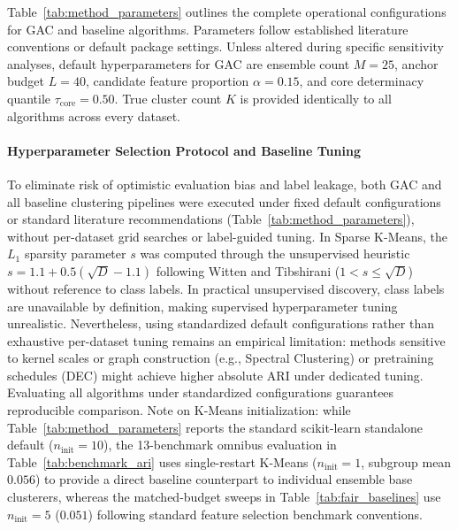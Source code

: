 \documentclass[pdflatex,sn-mathphys-num]{sn-jnl}
\theoremstyle{thmstyleone}
\theoremstyle{thmstyletwo}
\theoremstyle{thmstylethree}
\begin{document}
Table~\ref{tab:method_parameters} outlines the complete operational configurations for GAC and baseline algorithms. Parameters follow established literature conventions or default package settings. Unless altered during specific sensitivity analyses, default hyperparameters for GAC are ensemble count $M = 25$, anchor budget $L = 40$, candidate feature proportion $\alpha = 0.15$, and core determinacy quantile $\tau_{\text{core}} = 0.50$. True cluster count $K$ is provided identically to all algorithms across every dataset.

\paragraph{Hyperparameter Selection Protocol and Baseline Tuning}
To eliminate risk of optimistic evaluation bias and label leakage, both GAC and all baseline clustering pipelines were executed under fixed default configurations or standard literature recommendations (Table~\ref{tab:method_parameters}), without per-dataset grid searches or label-guided tuning. In Sparse K-Means, the $L_1$ sparsity parameter $s$ was computed through the unsupervised heuristic $s = 1.1 + 0.5(\sqrt{D} - 1.1)$ following Witten and Tibshirani ($1 < s \le \sqrt{D}$) without reference to class labels. In practical unsupervised discovery, class labels are unavailable by definition, making supervised hyperparameter tuning unrealistic. Nevertheless, using standardized default configurations rather than exhaustive per-dataset tuning remains an empirical limitation: methods sensitive to kernel scales or graph construction (e.g., Spectral Clustering) or pretraining schedules (DEC) might achieve higher absolute ARI under dedicated tuning. Evaluating all algorithms under standardized configurations guarantees reproducible comparison. Note on K-Means initialization: while Table~\ref{tab:method_parameters} reports the standard scikit-learn standalone default ($n_{\text{init}}=10$), the 13-benchmark omnibus evaluation in Table~\ref{tab:benchmark_ari} uses single-restart K-Means ($n_{\text{init}}=1$, subgroup mean $0.056$) to provide a direct baseline counterpart to individual ensemble base clusterers, whereas the matched-budget sweeps in Table~\ref{tab:fair_baselines} use $n_{\text{init}}=5$ ($0.051$) following standard feature selection benchmark conventions.
\end{document}
